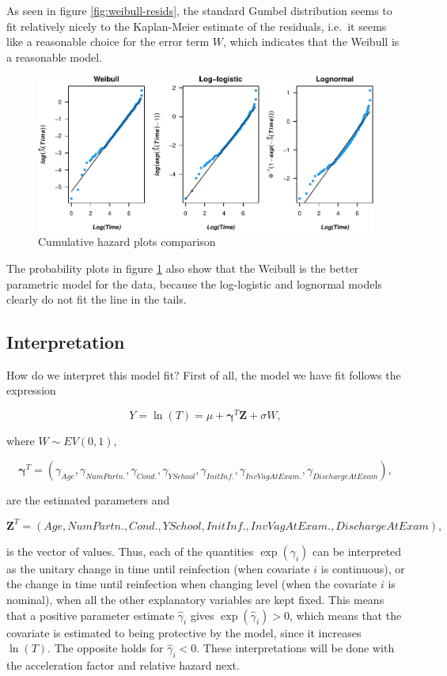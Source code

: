 \documentclass[
]{article}
\begin{document}
As seen in figure \ref{fig:weibull-resids}, the standard Gumbel distribution seems to fit relatively nicely to the Kaplan-Meier estimate of the residuals, i.e.~it seems like a reasonable choice for the error term \(W\), which indicates that the Weibull is a reasonable model.

\begin{figure}
\centering
\includegraphics{practical_files/figure-latex/cumhaz-plot-1.pdf}
\caption{\label{fig:cumhaz-plot}Cumulative hazard plots comparison}
\end{figure}

The probability plots in figure \ref{fig:cumhaz-plot} also show that the Weibull is the better parametric model for the data, because the log-logistic and lognormal models clearly do not fit the line in the tails.

\hypertarget{interpretation}{%
\subsection{Interpretation}\label{interpretation}}

How do we interpret this model fit? First of all, the model we have fit follows the expression

\[
Y = \ln(T) = \mu + \mathbf{\gamma}^T\mathbf{Z} + \sigma W,  
\]

where \(W \sim EV(0,1)\),

\[
\mathbf{\gamma}^T = (\gamma_{Age}, \gamma_{NumPartn.}, \gamma_{Cond.}, \gamma_{YSchool}, \gamma_{InitInf.}, \gamma_{InvVagAtExam.}, \gamma_{DischargeAtExam}),
\]

are the estimated parameters and

\[
\mathbf{Z}^T = (Age, NumPartn., Cond., YSchool, InitInf., InvVagAtExam., DischargeAtExam), 
\]

is the vector of values. Thus, each of the quantities \(\exp(\gamma_i)\) can be interpreted as the unitary change in time until reinfection (when covariate \(i\) is continuous), or the change in time until reinfection when changing level (when the covariate \(i\) is nominal), when all the other explanatory variables are kept fixed. This means that a positive parameter estimate \(\hat{\gamma}_i\) gives \(\exp(\hat{\gamma}_i) > 0\), which means that the covariate is estimated to being protective by the model, since it increases \(\ln(T)\). The opposite holds for \(\hat{\gamma}_i < 0\). These interpretations will be done with the acceleration factor and relative hazard next.
\end{document}
